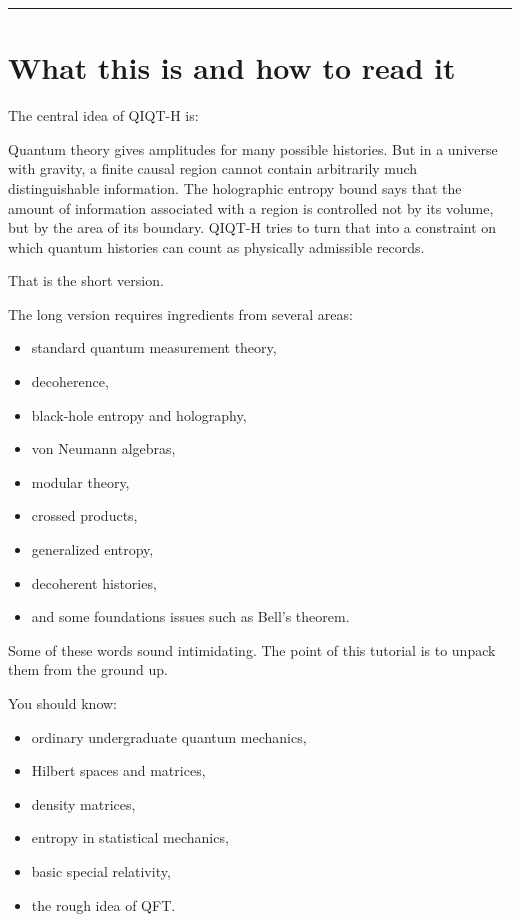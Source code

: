 \documentclass[11pt,a4paper]{article}
\newenvironment{qiqtquote}{\begin{mdframed}[style=quotestyle]}{\end{mdframed}}
\begin{document}
\medskip\hrule\medskip

\section{What this is and how to read it}

The central idea of QIQT-H is:

\begin{qiqtquote}
Quantum theory gives amplitudes for many possible histories. But in a universe with gravity, a finite causal region cannot contain arbitrarily much distinguishable information. The holographic entropy bound says that the amount of information associated with a region is controlled not by its volume, but by the area of its boundary. QIQT-H tries to turn that into a constraint on which quantum histories can count as physically admissible records.
\end{qiqtquote}

That is the short version.

The long version requires ingredients from several areas:

\begin{itemize}
  \item standard quantum measurement theory,
  \item decoherence,
  \item black-hole entropy and holography,
  \item von Neumann algebras,
  \item modular theory,
  \item crossed products,
  \item generalized entropy,
  \item decoherent histories,
  \item and some foundations issues such as Bell’s theorem.
\end{itemize}

Some of these words sound intimidating. The point of this tutorial is to unpack them from the ground up.

You should know:

\begin{itemize}
  \item ordinary undergraduate quantum mechanics,
  \item Hilbert spaces and matrices,
  \item density matrices,
  \item entropy in statistical mechanics,
  \item basic special relativity,
  \item the rough idea of QFT.
\end{itemize}
\end{document}
